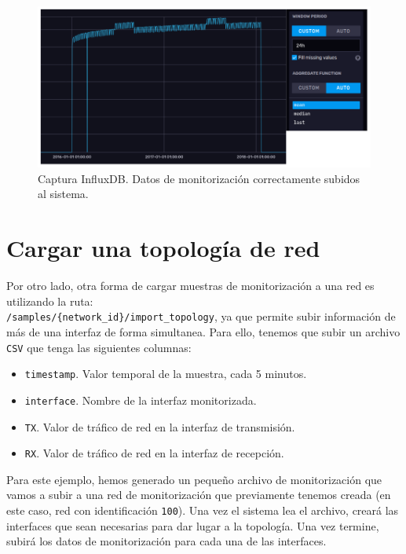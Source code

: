 \documentclass[a4paper, oneside, 12pt]{book}
\begin{document}
	\begin{figure}[h!]
		\begin{center}
			\includegraphics[width=1\textwidth]{diag/influxdb_data_1.png}
			\caption{Captura InfluxDB. Datos de monitorización correctamente subidos al sistema.}
			\label{img: influxdb data 1}
		\end{center}
	\end{figure}
	
	\pagebreak
	
	\section{Cargar una topología de red}
	
	\noindent Por otro lado, otra forma de cargar muestras de monitorización a una red es utilizando la ruta: \\
	 \texttt{/samples/\{network\_id\}/import\_topology}, ya que permite subir información de más de una interfaz de forma simultanea. Para ello, tenemos que subir un archivo \texttt{CSV} que tenga las siguientes columnas:
	 
	 \begin{itemize}
	 	\item \texttt{timestamp}. Valor temporal de la muestra, cada 5 minutos.
	 	\item \texttt{interface}. Nombre de la interfaz monitorizada.
	 	\item \texttt{TX}. Valor de tráfico de red en la interfaz de transmisión.
	 	\item \texttt{RX}. Valor de tráfico de red en la interfaz de recepción.
	 \end{itemize}
 
 	\noindent Para este ejemplo, hemos generado un pequeño archivo de monitorización que vamos a subir a una red de monitorización que previamente tenemos creada (en este caso, red con identificación \texttt{100}). Una vez el sistema lea el archivo, creará las interfaces que sean necesarias para dar lugar a la topología. Una vez termine, subirá los datos de monitorización para cada una de las interfaces. \\
 	
\end{document}

